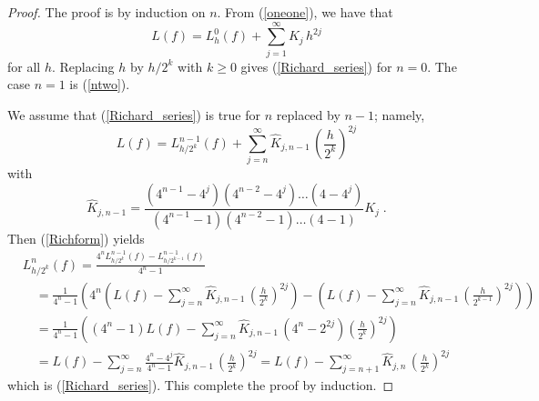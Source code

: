 \begin{proof}
The proof is by induction on $n$.  From (\ref{oneone}), we have that
\[
L(f) = L^0_h(f)+ \sum_{j=1}^\infty K_j\,h^{2j}
\]
for all $h$.  Replacing $h$ by $h/2^k$ with
$k\geq 0$ gives (\ref{Richard_series}) for $n=0$.  The case $n=1$ is
(\ref{ntwo}).

We assume that (\ref{Richard_series}) is true for $n$ replaced by
$n-1$; namely,
\[
L(f) = L_{h/2^k}^{n-1}(f) + \sum_{j=n}^\infty \hat{K}_{j,n-1}
\,\left(\frac{h}{2^k}\right)^{2j}
\]
with
\[
\hat{K}_{j,n-1} = 
\frac{(4^{n-1}-4^j)(4^{n-2} - 4^j) \ldots (4 - 4^j)}
{(4^{n-1}-1)(4^{n-2}-1)\ldots (4-1)} K_j \; .
\]
Then (\ref{Richform}) yields
\begin{align*}
&L_{h/2^k}^n(f) = \frac{4^n L_{h/2^k}^{n-1}(f) -
L_{h/2^{k-1}}^{n-1}(f)}{4^n -1} \\
&\quad = \frac{1}{4^n-1} \left(4^n \left(L(f) -
\sum_{j=n}^\infty \hat{K}_{j,n-1}\,\left(\frac{h}{2^k}\right)^{2j} \right)
- \left(L(f) -
\sum_{j=n}^\infty \hat{K}_{j,n-1}\,\left(\frac{h}{2^{k-1}}\right)^{2j}
\right)\right) \\
&\quad = \frac{1}{4^n-1} \left( (4^n -1)L(f) -
\sum_{j=n}^\infty \hat{K}_{j,n-1}\,\left( 4^n - 2^{2j}\right)
\left(\frac{h}{2^k}\right)^{2j} \right) \\
&\quad = L(f) - \sum_{j=n}^\infty \frac{4^n - 4^j}{4^n-1}\hat{K}_{j,n-1}
\,\left(\frac{h}{2^k}\right)^{2j}
= L(f) - \sum_{j=n+1}^\infty \hat{K}_{j,n}
\,\left(\frac{h}{2^k}\right)^{2j}
\end{align*}
which is (\ref{Richard_series}).  This complete the proof by
induction.
\end{proof}

